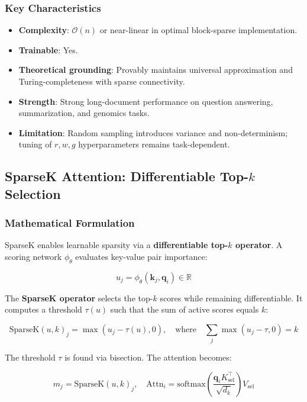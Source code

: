 \subsubsection{Key Characteristics}

\begin{itemize}[leftmargin=*]
    \item \textbf{Complexity}: $\mathcal{O}(n)$ or near-linear in optimal block-sparse implementation.
    \item \textbf{Trainable}: Yes.
    \item \textbf{Theoretical grounding}: Provably maintains universal approximation and Turing-completeness with sparse connectivity.
    \item \textbf{Strength}: Strong long-document performance on question answering, summarization, and genomics tasks.
    \item \textbf{Limitation}: Random sampling introduces variance and non-determinism; tuning of $r, w, g$ hyperparameters remains task-dependent.
\end{itemize}

\subsection{SparseK Attention: Differentiable Top-$k$ Selection}

\subsubsection{Mathematical Formulation}

SparseK \citep{lou_sparsek_2024} enables learnable sparsity via a \textbf{differentiable top-$k$ operator}. A scoring network $\phi_\theta$ evaluates key-value pair importance:

\[
u_j = \phi_\theta(\mathbf{k}_j, \mathbf{q}_i) \in \mathbb{R}
\]

The \textbf{SparseK operator} selects the top-$k$ scores while remaining differentiable. It computes a threshold $\tau(u)$ such that the sum of active scores equals $k$:

\[
\text{SparseK}(u, k)_j = \max(u_j - \tau(u), 0), \quad \text{where} \quad \sum_j \max(u_j - \tau, 0) = k
\]

The threshold $\tau$ is found via bisection. The attention becomes:

\[
m_j = \text{SparseK}(u, k)_j, \quad \text{Attn}_i = \text{softmax}\left(\frac{\mathbf{q}_i K_{\text{sel}}^\top}{\sqrt{d_k}}\right) V_{\text{sel}}
\]

